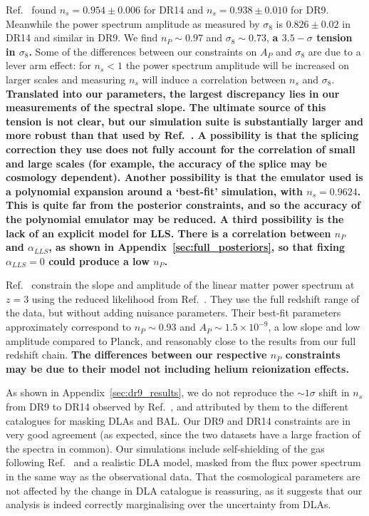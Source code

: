 Ref.~\cite{2020JCAP...04..038P} found $n_s = 0.954 \pm 0.006$ for DR14 and $n_s = 0.938 \pm 0.010$ for DR9.
Meanwhile the power spectrum amplitude as measured by $\sigma_8$ is $0.826 \pm 0.02$ in DR14 and similar in DR9.
We find $n_P \sim 0.97$ and $\sigma_8 \sim 0.73$, \textbf{a $3.5-\sigma$ tension in $\sigma_8$.} Some of the differences between our constraints on $A_P$ and $\sigma_8$ are due to a lever arm effect: for $n_s < 1$ the power spectrum amplitude will be increased on larger scales and measuring $n_s$ will induce a correlation between $n_s$ and $\sigma_8$. \textbf{Translated into our parameters, the largest discrepancy lies in our measurements of the spectral slope. The ultimate source of this tension is not clear, but our simulation suite is substantially larger and more robust than that used by Ref.~\cite{2020JCAP...04..038P}. A possibility is that the splicing correction they use does not fully account for the correlation of small and large scales (for example, the accuracy of the splice may be cosmology dependent). Another possibility is that the emulator used is a polynomial expansion around a `best-fit' simulation, with $n_s = 0.9624$. This is quite far from the posterior constraints, and so the accuracy of the polynomial emulator may be reduced. A third possibility is the lack of an explicit model for LLS. There is a correlation between $n_P$ and $\alpha_{LLS}$, as shown in Appendix~\ref{sec:full_posteriors}, so that fixing $\alpha_{LLS} = 0$ could produce a low $n_P$.}

Ref.~\cite{2023arXiv230300746G} constrain the slope and amplitude of the linear matter power spectrum at $z=3$ using the reduced likelihood from Ref.~\cite{2023ApJ...944..223P}.
They use the full redshift range of the data, but without adding nuisance parameters.
Their best-fit parameters approximately correspond to $n_P \sim 0.93$ and $A_P \sim 1.5 \times 10^{-9}$, a low slope and low amplitude compared to Planck, and reasonably close to the results from our full redshift chain. \textbf{The differences between our respective $n_P$ constraints may be due to their model not including helium reionization effects.}

As shown in Appendix~\ref{sec:dr9_results}, we do not reproduce the $\sim 1\sigma$ shift in $n_s$ from DR9 to DR14 observed by Ref.~\cite{2020JCAP...04..038P}, and attributed by them to the different catalogues for masking DLAs and BAL.
Our DR9 and DR14 constraints are in very good agreement (as expected, since the two datasets have a large fraction of the spectra in common).
Our simulations include self-shielding of the gas following Ref.~\cite{Rahmati:2013} and a realistic DLA model, masked from the flux power spectrum in the same way as the observational data.
That the cosmological parameters are not affected by the change in DLA catalogue is reassuring, as it suggests that our analysis is indeed correctly marginalising over the uncertainty from DLAs.

